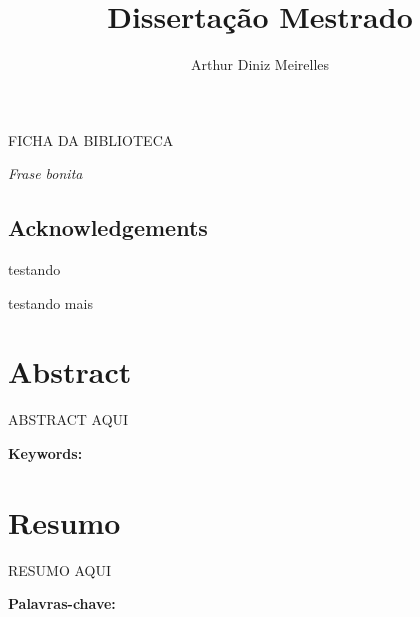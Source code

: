 \documentclass[openany,a4paper,12pt,oneside]{book}
\title{Dissertação Mestrado}
\author{Arthur Diniz Meirelles}
\date{}
\begin{document}



\newpage

\begin{center}
\thispagestyle{empty}
\vspace*{\fill}
FICHA DA BIBLIOTECA
\vspace*{\fill}
\end{center}

\newpage




\begin{center}
\thispagestyle{empty}
\vspace*{\fill}
\textit{Frase bonita}
\vspace*{\fill}
\end{center}



\begingroup
{}
\begin{spacing}{1.5}
\chapter*{Acknowledgements}
    testando

    testando mais
\end{spacing}
\endgroup

\chapter*{Abstract}

ABSTRACT AQUI

\vspace{1cm}

\noindent \textbf{Keywords:}

\chapter*{Resumo}

RESUMO AQUI

\vspace{1cm}

\noindent \textbf{Palavras-chave:}

\end{document}
